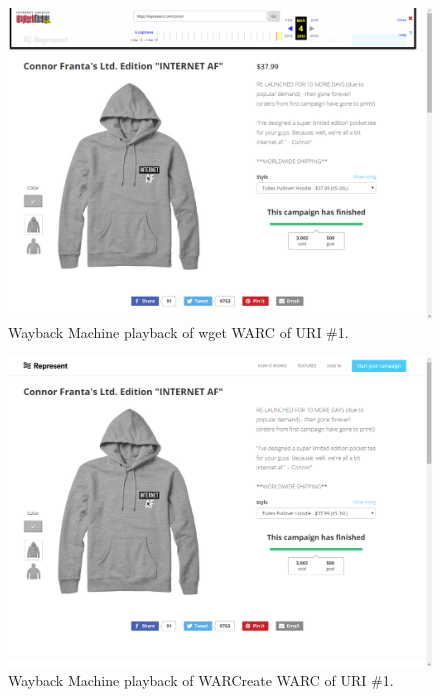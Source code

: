 \documentclass[a4paper,12pt]{article}
\begin{document}
\begin{appendices}
\begin{figure}[H]
    \centering
    \includegraphics[scale=0.5]{images/1_wget_in_wayback.png}
    \caption{Wayback Machine playback of wget WARC of URI \#1.}
\end{figure}
\begin{figure}[H]
    \centering
    \includegraphics[scale=0.5]{images/1_warcreate_in_wayback.png}
    \caption{Wayback Machine playback of WARCreate WARC of URI \#1.}
\end{figure}
\begin{figure}[H]
    \centering

\end{figure}
\end{appendices}
\end{document}
